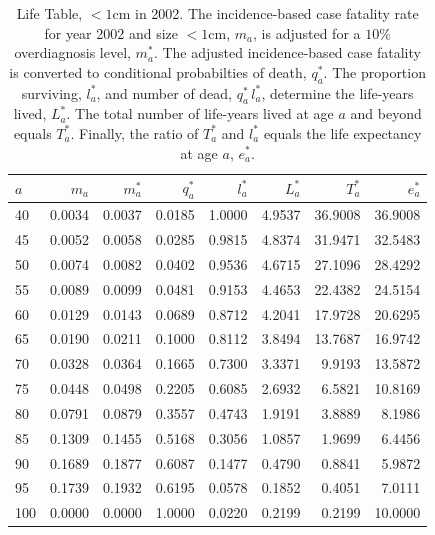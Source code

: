 \documentclass[11pt,letterpaper]{article}
\theoremstyle{plain}
\theoremstyle{remark}
\numberwithin{equation}{section}
\begin{document}
\begin{center}
  \begin{table}[h]
\begin{tabular}{@{}l rrrr rrr@{}}
$a$ & $m_a$ & $m_a^*$ & $q_a^*$ & $l_a^*$ & $L_a^*$ & $T_a^*$ & $e_a^*$\\
  \midrule
40&	0.0034&	0.0037&	0.0185&	1.0000&	4.9537&	36.9008&	36.9008\\
45&	0.0052&	0.0058&	0.0285&	0.9815&	4.8374&	31.9471&	32.5483\\
50&	0.0074&	0.0082&	0.0402&	0.9536&	4.6715&	27.1096&	28.4292\\
55&	0.0089&	0.0099&	0.0481&	0.9153&	4.4653&	22.4382&	24.5154\\
60&	0.0129&	0.0143&	0.0689&	0.8712&	4.2041&	17.9728&	20.6295\\
65&	0.0190&	0.0211&	0.1000&	0.8112&	3.8494&	13.7687&	16.9742\\
70&	0.0328&	0.0364&	0.1665&	0.7300&	3.3371&	9.9193&	13.5872\\
75&	0.0448&	0.0498&	0.2205&	0.6085&	2.6932&	6.5821&	10.8169\\
80&	0.0791&	0.0879&	0.3557&	0.4743&	1.9191&	3.8889&	8.1986\\
85&	0.1309&	0.1455&	0.5168&	0.3056&	1.0857&	1.9699&	6.4456\\
90&	0.1689&	0.1877&	0.6087&	0.1477&	0.4790&	0.8841&	5.9872\\
95&	0.1739&	0.1932&	0.6195&	0.0578&	0.1852&	0.4051&	7.0111\\
100&0.0000&	0.0000&	1.0000&	0.0220&	0.2199&	0.2199&	10.0000\\
  \bottomrule
\end{tabular}
\caption{Life Table, $<1$cm in 2002.  The incidence-based case fatality rate for year 2002 and size
  $<1$cm, $m_a$, is adjusted for a $10\%$ overdiagnosis level, $m_a^*$.
  The adjusted incidence-based case fatality is converted to
  conditional probabilties of death, $q_a^*$.  The proportion
  surviving, $l_a^*$, and number of dead, $q_a^* \,l_a^*$, determine
  the life-years lived, $L_a^*$.  The total number of life-years lived
  at age $a$ and beyond equals $T_a^*$.  Finally, the ratio of $T_a^*$
  and $l_a^*$ equals the life expectancy at age $a$, $e_a^*$.}
\end{table}
\end{center}

\end{document}

